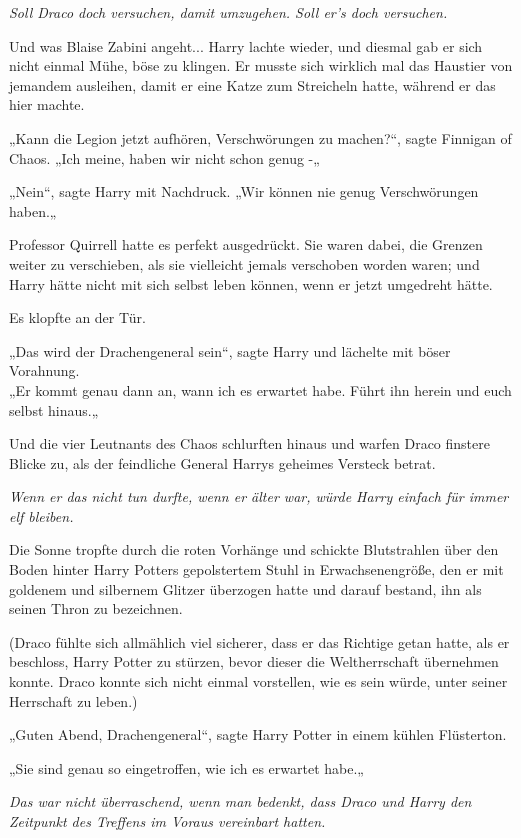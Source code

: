 {\emph{Soll Draco doch versuchen, damit umzugehen. Soll er's doch versuchen.}

Und was Blaise Zabini angeht... Harry lachte wieder, und diesmal gab er sich nicht einmal Mühe, böse zu klingen. Er musste sich wirklich mal das Haustier von jemandem ausleihen, damit er eine Katze zum Streicheln hatte, während er das hier machte.

„Kann die Legion jetzt aufhören, Verschwörungen zu machen?“, sagte Finnigan of Chaos. „Ich meine, haben wir nicht schon genug -„

„Nein“, sagte Harry mit Nachdruck. „Wir können nie genug Verschwörungen haben.„

Professor Quirrell hatte es perfekt ausgedrückt. Sie waren dabei, die Grenzen weiter zu verschieben, als sie vielleicht jemals verschoben worden waren; und Harry hätte nicht mit sich selbst leben können, wenn er jetzt umgedreht hätte.

Es klopfte an der Tür.

„Das wird der Drachengeneral sein“, sagte Harry und lächelte mit böser Vorahnung.\\ „Er kommt genau dann an, wann ich es erwartet habe. Führt ihn herein und euch selbst hinaus.„

Und die vier Leutnants des Chaos schlurften hinaus und warfen Draco finstere Blicke zu, als der feindliche General Harrys geheimes Versteck betrat.

\emph{Wenn er das nicht tun durfte, wenn er älter war, würde Harry einfach für immer elf bleiben.}

Die Sonne tropfte durch die roten Vorhänge und schickte Blutstrahlen über den Boden hinter Harry Potters gepolstertem Stuhl in Erwachsenengröße, den er mit goldenem und silbernem Glitzer überzogen hatte und darauf bestand, ihn als seinen Thron zu bezeichnen.

(Draco fühlte sich allmählich viel sicherer, dass er das Richtige getan hatte, als er beschloss, Harry Potter zu stürzen, bevor dieser die Weltherrschaft übernehmen konnte. Draco konnte sich nicht einmal vorstellen, wie es sein würde, unter seiner Herrschaft zu leben.)

„Guten Abend, Drachengeneral“, sagte Harry Potter in einem kühlen Flüsterton.

„Sie sind genau so eingetroffen, wie ich es erwartet habe.„

\emph{Das war nicht überraschend, wenn man bedenkt, dass Draco und Harry den Zeitpunkt des Treffens im Voraus vereinbart hatten.}

}
